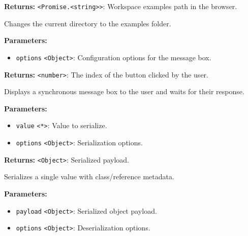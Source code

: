 \documentclass[12pt,a4paper]{article}
\begin{document}
\noindent \textbf{Returns:} \texttt{<Promise.<string>>}: Workspace examples path in the browser.

\noindent Changes the current directory to the examples folder.

\vspace{5mm}
\noindent {}


\noindent \textbf{Parameters:}
\begin{itemize}
  \item \texttt{options} \texttt{<Object>}: Configuration options for the message box.
\end{itemize}

\noindent \textbf{Returns:} \texttt{<number>}: The index of the button clicked by the user.

\noindent Displays a synchronous message box to the user and waits for their response.

\vspace{5mm}
\noindent {}


\noindent \textbf{Parameters:}
\begin{itemize}
  \item \texttt{value} \texttt{<*>}: Value to serialize.
  \item \texttt{options} \texttt{<Object>}: Serialization options.
\end{itemize}

\noindent \textbf{Returns:} \texttt{<Object>}: Serialized payload.

\noindent Serializes a single value with class/reference metadata.

\vspace{5mm}
\noindent {}


\noindent \textbf{Parameters:}
\begin{itemize}
  \item \texttt{payload} \texttt{<Object>}: Serialized object payload.
  \item \texttt{options} \texttt{<Object>}: Deserialization options.
\end{itemize}
\end{document}
